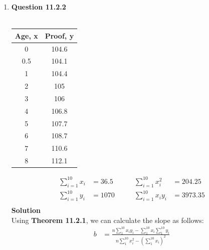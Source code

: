 \documentclass{uofa-eng-assignment}
\begin{document}
\begin{enumerate}
\begin{figure}[h]
        \end{figure}
    \item[]
        \textbf{Question 11.2.2} \\ \\
        \begin{table}[h]
            \centering
            \begin{tabular}{cc}
                \hline
                Age, x & Proof, y \\
                \hline
                0      & 104.6    \\
                0.5    & 104.1    \\
                1      & 104.4    \\
                2      & 105      \\
                3      & 106      \\
                4      & 106.8    \\
                5      & 107.7    \\
                6      & 108.7    \\
                7      & 110.6    \\
                8      & 112.1    \\
            \end{tabular}
        \end{table}
        \begin{align*}
            \sum_{i=1}^{10}x_i & = 36.5 \qquad & \sum_{i=1}^{10}x_i^2  & = 204.25  \\
            \sum_{i=1}^{10}y_i & = 1070 \qquad & \sum_{i=1}^{10}x_iy_i & = 3973.35 \\
        \end{align*}
        \textbf{Solution} \\
        Using \textbf{Theorem 11.2.1}, we can calculate the slope as follows:
        \begin{align*}
            b & = \frac{n\sum_{1}^{10}x_iy_i - \sum_{1}^{10}x_i\sum_{1}^{10}y_i}{n\sum_{1}^{10}x_i^2 - (\sum_{1}^{10}x_i)^2} \\

\end{align*}
\end{enumerate}
\end{document}
